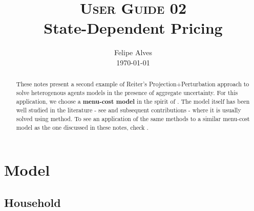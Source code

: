 \documentclass[a4paper,10pt]{article}  %
\title{\textsc{User Guide 02} \\ State-Dependent Pricing \vspace{-1.25em}} %
\author{
        \normalfont\large Felipe Alves \\[-2.5pt]       \normalsize
        \today
}
\date{ \vspace{-3em} }
\begin{document}
\maketitle
\begin{abstract}
   These notes present a second example of Reiter’s Projection+Perturbation approach to solve heterogenous agents models in the
   presence of aggregate uncertainty. For this application, we choose a \textbf{menu-cost model} in the spirit of \citet{GolosovLucas}.
   The model itself has been well studied in the literature - see \citet{midrigan} and \citet{Vavra} subsequent contributions - where
   it is usually solved using \citet{krusell_smith} method. To see an application of the same methods to a similar menu-cost model as
   the one discussed in these notes, check \citet{reiterstudent}.
\end{abstract}
   


\section{Model} %
\label{sec:model}

\subsection{Household} %
\label{sub:household}
\end{document}
